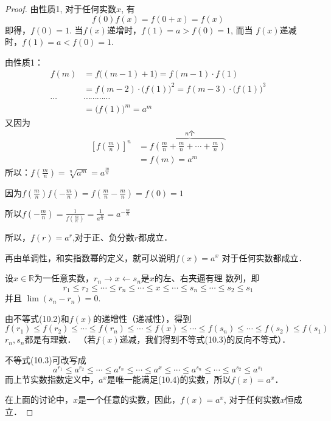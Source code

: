 \begin{proof}
由性质1, 对于任何实数$x$, 有
\[f(0)f(x)=f(0+x)=f(x)\]
即得，$f(0)=1$. 当$f(x)$递增时，$f(1)=a>f(0)=1$, 而当
$f(x)$递减时，$f(1)=a<f(0)=1$.

由性质1：
\[\begin{split}
  f(m)&=f\big((m-1)+1\big)=f(m-1)\cdot f(1)\\
  &=f(m-2)\cdot \big(f(1)\big)^2=f(m-3)\cdot \big(f(1)\big)^3\\
\cdots & \cdots \cdots \cdots \cdots \\
&=\big(f(1)\big)^m=a^m
\end{split}\]
又因为
\[\begin{split}
  \left[f\left(\frac{m}{n}\right)\right]^n&=f\overbrace{\left(\frac{m}{n}+\frac{m}{n}+\cdots +\frac{m}{n}\right)}^{n\text{个}}\\
  &=f(m)=a^m
\end{split}\]
所以：$f\left(\frac{m}{n}\right)=\sqrt[n]{a^m}=a^{\tfrac{m}{n}}$

因为$f\left(\frac{m}{n}\right)f\left(-\frac{m}{n}\right)=f\left(\frac{m}{n}-\frac{m}{n}\right)=f(0)=1$

所以$f\left(-\frac{m}{n}\right)=\frac{1}{f\left(\frac{m}{n}\right)}=\frac{1}{a^{\tfrac{m}{n}}}=a^{-\tfrac{m}{n}}$

所以，$f(r)=a^r$,对于正、负分数$r$都成立．

再由单调性，和实指数幂的定义，就可以说明$f(x)=a^x$
对于任何实数都成立．

设$x\in\mathbb{R}$为一任意实数，$r_n\to x\leftarrow s_n$是$x$的左、右夹逼有理
数列，即
\begin{equation}
  r_1\le r_2\le \cdots \le r_n\le \cdots \le x\le \cdots \le s_n\le \cdots \le s_2\le s_1
\end{equation}
并且 $\lim(s_n-r_n)=0$.

由不等式(10.2)和$f(x)$的递增性（递减性），得到
\begin{equation}
  f(r_1)\le f(r_2)\le \cdots \le f(r_n)\le \cdots \le f(x)\le \cdots \le f(s_n)\le \cdots \le f(s_2)\le f(s_1)
\end{equation}
$r_n,s_n$都是有理数．
（若$f(x)$递减，我们得到不等式(10.3)的反向不等式）．

不等式(10.3)可改写成
\begin{equation}
  a^{r_1}\le a^{r_2}\le \cdots \le a^{r_n}\le \cdots \le a^{x}\le \cdots \le a^{s_n}\le \cdots \le a^{s_2}\le a^{s_1}
\end{equation}
而上节实数指数定义中，$a^x$是唯一能满足(10.4)的实数，所以$f(x)=a^x$．

在上面的讨论中，$x$是一个任意的实数，因此，$f(x)=
a^x$, 对于任何实数$x$恒成立．
\end{proof}

